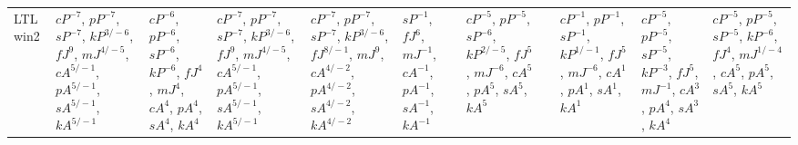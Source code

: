 \documentclass[letterpaper]{article} %
\begin{document}
\begin{sidewaystable*}
\begin{tabular}{l l l l l l l l l l l }
\multirow{10}{1.7cm}{LTL win2} & \multirow{10}{1.7cm}{$cP^{-7}$, $pP^{-7}$, $sP^{-7}$, $kP^{3/-6}$, $fJ^{9}$, $mJ^{4/-5}$, $cA^{5/-1}$, $pA^{5/-1}$, $sA^{5/-1}$, $kA^{5/-1}$} & \multirow{10}{1.7cm}{$cP^{-6}$, $pP^{-6}$, $sP^{-6}$, $kP^{-6}$, $fJ^{4}$, $mJ^{4}$, $cA^{4}$, $pA^{4}$, $sA^{4}$, $kA^{4}$} & \multirow{10}{1.7cm}{$cP^{-7}$, $pP^{-7}$, $sP^{-7}$, $kP^{3/-6}$, $fJ^{9}$, $mJ^{4/-5}$, $cA^{5/-1}$, $pA^{5/-1}$, $sA^{5/-1}$, $kA^{5/-1}$} & \multirow{10}{1.7cm}{$cP^{-7}$, $pP^{-7}$, $sP^{-7}$, $kP^{3/-6}$, $fJ^{8/-1}$, $mJ^{9}$, $cA^{4/-2}$, $pA^{4/-2}$, $sA^{4/-2}$, $kA^{4/-2}$} & \multirow{10}{1.7cm}{$sP^{-1}$, $fJ^{6}$, $mJ^{-1}$, $cA^{-1}$, $pA^{-1}$, $sA^{-1}$, $kA^{-1}$} & \multirow{10}{1.7cm}{$cP^{-5}$, $pP^{-5}$, $sP^{-6}$, $kP^{2/-5}$, $fJ^{5}$, $mJ^{-6}$, $cA^{5}$, $pA^{5}$, $sA^{5}$, $kA^{5}$} & \multirow{10}{1.7cm}{} & \multirow{10}{1.7cm}{$cP^{-1}$, $pP^{-1}$, $sP^{-1}$, $kP^{1/-1}$, $fJ^{5}$, $mJ^{-6}$, $cA^{1}$, $pA^{1}$, $sA^{1}$, $kA^{1}$} & \multirow{10}{1.7cm}{$cP^{-5}$, $pP^{-5}$, $sP^{-5}$, $kP^{-3}$, $fJ^{5}$, $mJ^{-1}$, $cA^{3}$, $pA^{4}$, $sA^{3}$, $kA^{4}$} & \multirow{10}{1.7cm}{$cP^{-5}$, $pP^{-5}$, $sP^{-5}$, $kP^{-6}$, $fJ^{4}$, $mJ^{1/-4}$, $cA^{5}$, $pA^{5}$, $sA^{5}$, $kA^{5}$} \\ \\ \\ \\ \\ \\ \\ \\ \\ \\
\midrule

\end{tabular}
\end{sidewaystable*}
\end{document}
